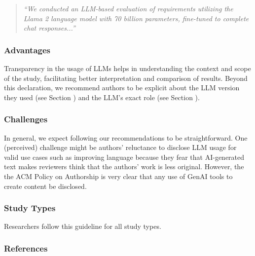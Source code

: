 \begin{quote}
\small
\it
``We conducted an LLM-based evaluation of requirements utilizing the Llama 2 language model with 70 billion parameters, fine-tuned to complete chat responses...''
\end{quote}

\subsubsection{Advantages}

Transparency in the usage of LLMs helps in understanding the context and scope of the study, facilitating better interpretation and comparison of results.
Beyond this declaration, we recommend authors to be explicit about the LLM version they used (see Section \modelversion) and the LLM's exact role (see Section \toolarchitecture).

\subsubsection{Challenges}

In general, we expect following our recommendations to be straightforward.
One (perceived) challenge might be authors' reluctance to disclose LLM usage for valid use cases such as improving language because they fear that AI-generated text makes reviewers think that the authors' work is less original.
However, the the ACM Policy on Authorship is very clear that any use of GenAI tools to create content \must be disclosed.

\subsubsection{Study Types}

Researchers \must follow this guideline for all study types.

\subsubsection{References}





